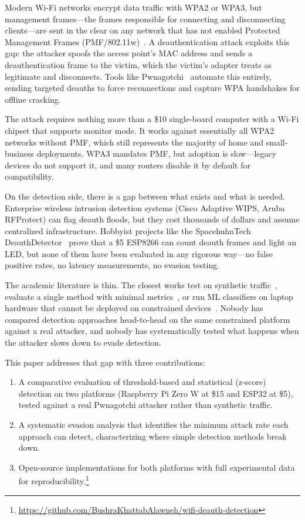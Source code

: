 \documentclass[conference]{IEEEtran}
\begin{document}
Modern Wi-Fi networks encrypt data traffic with WPA2 or WPA3, but management frames---the frames responsible for connecting and disconnecting clients---are sent in the clear on any network that has not enabled Protected Management Frames (PMF/802.11w)~\cite{ieee80211w}. A deauthentication attack exploits this gap: the attacker spoofs the access point's MAC address and sends a deauthentication frame to the victim, which the victim's adapter treats as legitimate and disconnects. Tools like Pwnagotchi~\cite{pwnagotchi} automate this entirely, sending targeted deauths to force reconnections and capture WPA handshakes for offline cracking.

The attack requires nothing more than a \$10 single-board computer with a Wi-Fi chipset that supports monitor mode. It works against essentially all WPA2 networks without PMF, which still represents the majority of home and small-business deployments. WPA3 mandates PMF, but adoption is slow---legacy devices do not support it, and many routers disable it by default for compatibility.

On the detection side, there is a gap between what exists and what is needed. Enterprise wireless intrusion detection systems (Cisco Adaptive WIPS, Aruba RFProtect) can flag deauth floods, but they cost thousands of dollars and assume centralized infrastructure. Hobbyist projects like the SpacehuhnTech DeauthDetector~\cite{spacehuhn_detector} prove that a \$5 ESP8266 can count deauth frames and light an LED, but none of them have been evaluated in any rigorous way---no false positive rates, no latency measurements, no evasion testing.

The academic literature is thin. The closest works test on synthetic traffic~\cite{nature2025_deauth}, evaluate a single method with minimal metrics~\cite{ijert2024_deauth}, or run ML classifiers on laptop hardware that cannot be deployed on constrained devices~\cite{ieee2023_deauth_ml}. Nobody has compared detection approaches head-to-head on the same constrained platform against a real attacker, and nobody has systematically tested what happens when the attacker slows down to evade detection.

This paper addresses that gap with three contributions:

\begin{enumerate}
    \item A comparative evaluation of threshold-based and statistical (z-score) detection on two platforms (Raspberry Pi Zero W at \$15 and ESP32 at \$5), tested against a real Pwnagotchi attacker rather than synthetic traffic.
    \item A systematic evasion analysis that identifies the minimum attack rate each approach can detect, characterizing where simple detection methods break down.
    \item Open-source implementations for both platforms with full experimental data for reproducibility.\footnote{\url{https://github.com/BushraKhattabAlawneh/wifi-deauth-detection}}
\end{enumerate}
\end{document}
